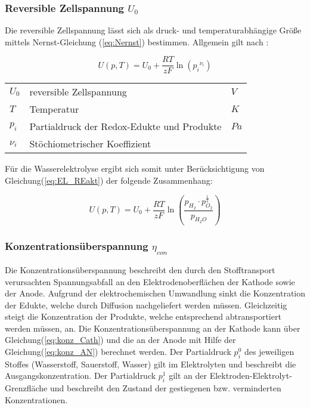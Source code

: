 \documentclass[onecolumn,10pt,titlepage]{article}
\begin{document}

	\subsubsection*{Reversible Zellspannung $U_0$ }

	Die reversible Zellspannung lässt sich als druck- und temperaturabhängige Größe mittels Nernst-Gleichung (\ref{eq:Nernst}) bestimmen. Allgemein gilt nach \cite{NI.2007}:

	\begin{equation}
	U(p,T) = U_0 + \frac{RT}{zF}\ln{\left({p_i}^{\nu_{i}}\right)}
	\label{eq:Nernst}
	\end{equation}

	\begin{table}[H]
		\begin{tabular*}{\textwidth}{lll}\\
			$U_0$&reversible Zellspannung&$V$\\
			$T$&Temperatur&$K$\\
			$p_i$&Partialdruck der Redox-Edukte und Produkte&$Pa$\\
			$\nu_i$&Stöchiometrischer Koeffizient&\\
		\end{tabular*}
	\end{table}

	Für die Wasserelektrolyse ergibt sich somit unter Berücksichtigung von Gleichung(\ref{eq:EL_REakt}) der folgende Zusammenhang:

	\begin{equation}
	U(p,T) = U_0 + \frac{RT}{zF}\ln{\left(\frac{p_{H_2}\cdot p_{O_2}^{\frac{1}{2}}}{p_{H_2O}}\right)}
	\label{key}
	\end{equation}

	\subsubsection*{Konzentrationsüberspannung $\eta_{con}$}
	Die Konzentrationsüberspannung beschreibt den durch den Stofftransport verursachten Spannungsabfall an den Elektrodenoberflächen der Kathode sowie der Anode.\cite{UniversitatUlm.2016} Aufgrund der elektrochemischen Umwandlung sinkt die Konzentration der Edukte, welche durch Diffusion nachgeliefert werden müssen. Gleichzeitig steigt die Konzentration der Produkte, welche entsprechend abtransportiert werden müssen, an. Die Konzentrationsüberspannung an der Kathode kann über Gleichung(\ref{eq:konz_Cath}) und die an der Anode mit Hilfe der Gleichung(\ref{eq:konz_AN}) berechnet werden.\cite{NI.2007}
	  Der Partialdruck $p_i^0$ des jeweiligen Stoffes (Wasserstoff, Sauerstoff, Wasser) gilt  im Elektrolyten und beschreibt die Ausgangskonzentration. Der Partialdruck $p_i^1$  gilt an der Elektroden-Elektrolyt-Grenzfläche und beschreibt den Zustand der gestiegenen bzw. verminderten Konzentrationen.
\end{document}
